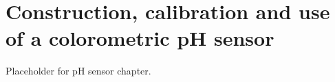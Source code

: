 \setchapterpreamble[u]{\margintoc}
\chapter{Construction, calibration and use of a colorometric pH sensor}

Placeholder for pH sensor chapter.
